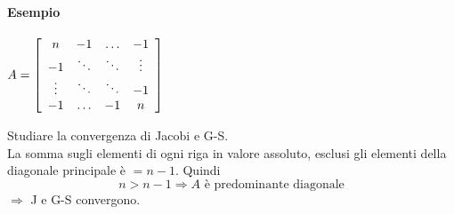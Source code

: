 \documentclass[10pt]{book}
\begin{document}
\paragraph{Esempio}
\begin{multicols}{2}
\begin{center}
$A = \left[\begin{array}{c c c c}
n & -1 & \ldots & -1\\
-1 & \ddots & \ddots & \vdots\\
\vdots & \ddots & \ddots & -1\\
-1 & \ldots & -1 & n
\end{array}\right]$
\end{center}
\columnbreak
Studiare la convergenza di Jacobi e G-S.\\
La somma sugli elementi di ogni riga in valore assoluto, esclusi gli elementi della diagonale principale è $= n-1$. Quindi
$$n > n-1 \Rightarrow A\text{ è predominante diagonale}$$
$\Rightarrow$ J e G-S convergono.
\end{multicols}
\end{document}
